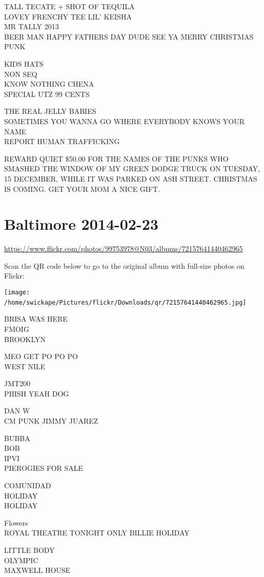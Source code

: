 \documentclass[10pt,letterpaper]{article}
\begin{document}
TALL TECATE + SHOT OF TEQUILA\\
LOVEY FRENCHY TEE LIL' KEISHA\\
MR TALLY 2013\\
BEER MAN HAPPY FATHERS DAY DUDE SEE YA MERRY CHRISTMAS PUNK

KIDS HATS\\
NON SEQ\\
KNOW NOTHING CHENA\\
SPECIAL UTZ 99 CENTS

THE REAL JELLY BABIES\\
SOMETIMES YOU WANNA GO WHERE EVERYBODY KNOWS YOUR NAME\\
REPORT HUMAN TRAFFICKING

REWARD QUIET \$50.00 FOR THE NAMES OF THE PUNKS WHO SMASHED THE WINDOW OF MY GREEN DODGE TRUCK ON TUESDAY, 15 DECEMBER, WHILE IT WAS PARKED ON ASH STREET.  CHRISTMAS IS COMING.  GET YOUR MOM A NICE GIFT.
\

\section*{Baltimore 2014-02-23}

\url{https://www.flickr.com/photos/99753978@N03/albums/72157641440462965}

Scan the QR code below to go to the original album with full-size photos on Flickr:

\texttt{[image: /home/swickape/Pictures/flickr/Downloads/qr/72157641440462965.jpg]}
\

BRISA WAS HERE\\
FMOIG\\
BROOKLYN

MEO GET PO PO PO\\
WEST NILE

JMT200\\
PHISH YEAH DOG

DAN W\\
CM PUNK JIMMY JUAREZ

BUBBA\\
BOB\\
IPVI\\
PIEROGIES FOR SALE

COMUNIDAD\\
HOLIDAY\\
HOLIDAY

Flowers\\
ROYAL THEATRE TONIGHT ONLY BILLIE HOLIDAY

LITTLE BODY\\
OLYMPIC\\
MAXWELL HOUSE
\end{document}
